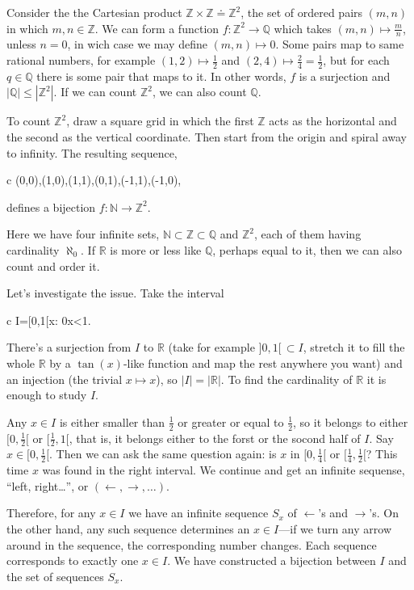 \documentclass[11pt,%
]{memoir}
\newenvironment{eqna}{\begin{IEEEeqnarray}{c}}{\end{IEEEeqnarray}\ignorespacesafterend}
\newcommand{\NN}{\mathbb{N}}
\newcommand{\RR}{\mathbb{R}}
\newcommand{\ZZ}{\mathbb{Z}}
\newcommand{\QQ}{\mathbb{Q}}
\begin{document}
Consider the the Cartesian product \(\ZZ\times\ZZ\doteq\ZZ^2\), the set of ordered pairs \((m,n)\) in which \(m,n\in\ZZ\). We can form a function \(f:\ZZ^2\rightarrow\QQ\) which takes \((m,n)\mapsto\frac{m}{n}\), unless \(n=0\), in wich case we may define \((m,n)\mapsto 0\). Some pairs map to same rational numbers, for example \((1,2)\mapsto\frac{1}{2}\) and \((2,4)\mapsto\frac{2}{4}=\frac{1}{2}\), but for each \(q\in\QQ\) there is some pair that maps to it. In other words, \(f\) is a surjection and \(|\QQ|\leq|\ZZ^2|\). If we can count \(\ZZ^2\), we can also count \(\QQ\).

To count \(\ZZ^2\), draw a square grid in which the first \(\ZZ\) acts as the horizontal and the second as the vertical coordinate. Then start from the origin and spiral away to infinity. The resulting sequence,
\begin{eqna}
    (0,0),(1,0),(1,1),(0,1),(-1,1),(-1,0),\dotsc%
\end{eqna}
defines a bijection \(f:\NN\rightarrow\ZZ^2\).

Here we have four infinite sets, \(\NN\subset\ZZ\subset\QQ\) and \(\ZZ^2\), each of them having cardinality \(\aleph_0\). If \(\RR\) is more or less like \(\QQ\), perhaps equal to it, then we can also count and order it. %

Let's investigate the issue. Take the interval
\begin{eqna}
    I=[0,1[\;\doteq\lbrace x\in\RR : 0\leq x<1\rbrace.
\end{eqna}
There's a surjection from \(I\) to \(\RR\) (take for example \(]0,1[\,\subset I\), stretch it to fill the whole \(\RR\) by a \(\tan(x)\)-like function and map the rest anywhere you want) and an injection (the trivial \(x\mapsto x\)), so \(|I|=|\RR|\). To find the cardinality of \(\RR\) it is enough to study \(I\).%

Any \(x\in I\) is either smaller than \(\frac{1}{2}\) or greater or equal to \(\frac{1}{2}\), so it belongs to either \([0,\frac{1}{2}[\) or \([\frac{1}{2},1[\), that is, it belongs either to the forst or the socond half of \(I\). Say \(x\in[0,\frac{1}{2}[\). Then we can ask the same question again: is \(x\) in \([0,\frac{1}{4}[\) or \([\frac{1}{4},\frac{1}{2}[\)? This time \(x\) was found in the right interval. We continue and get an infinite sequense, ``left, right\ldots'', or \((\leftarrow,\rightarrow,\dotsc)\).

Therefore, for any \(x\in I\) we have an infinite sequence \(S_x\) of \(\leftarrow\)'s and \(\rightarrow\)'s. On the other hand, any such sequence determines an \(x\in I\)---if we turn any arrow around in the sequence, the corresponding number changes. Each sequence corresponds to exactly one \(x\in I\). We have constructed a bijection between \(I\) and the set of sequences \(S_x\).
\end{document}
